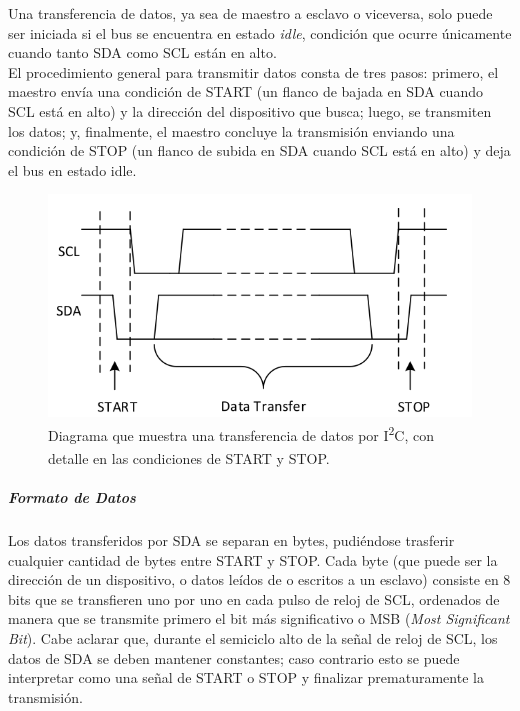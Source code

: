 Una transferencia de datos, ya sea de maestro a esclavo o viceversa, solo puede ser iniciada si el bus se encuentra en estado \textit{idle}, condición que ocurre únicamente cuando tanto SDA como SCL están en alto.\\

El procedimiento general para transmitir datos consta de tres pasos: primero, el maestro envía una condición de START (un flanco de bajada en SDA cuando SCL está en alto) y la dirección del dispositivo que busca; luego, se transmiten los datos; y, finalmente, el maestro concluye la transmisión enviando una condición de STOP (un flanco de subida en SDA cuando SCL está en alto) y deja el bus en estado idle.\\

\begin{figure}[h]
    \centering
    \includegraphics[scale=0.4]{Imagenes/START y STOP I2C.png}
    \caption{Diagrama que muestra una transferencia de datos por I\textsuperscript{2}C, con detalle en las condiciones de START y STOP.\textsuperscript{\cite{I2C}}}
    \label{start_stop_i2c}
\end{figure}

\subparagraph{Formato de Datos}

Los datos transferidos por SDA se separan en bytes, pudiéndose trasferir cualquier cantidad de bytes entre START y STOP. Cada byte (que puede ser la dirección de un dispositivo, o datos leídos de o escritos a un esclavo) consiste en 8 bits que se transfieren uno por uno en cada pulso de reloj de SCL, ordenados de manera que se transmite primero el bit más significativo o MSB (\textit{Most Significant Bit}). Cabe aclarar que, durante el semiciclo alto de la señal de reloj de SCL, los datos de SDA se deben mantener constantes; caso contrario esto se puede interpretar como una señal de START o STOP y finalizar prematuramente la transmisión.\\

